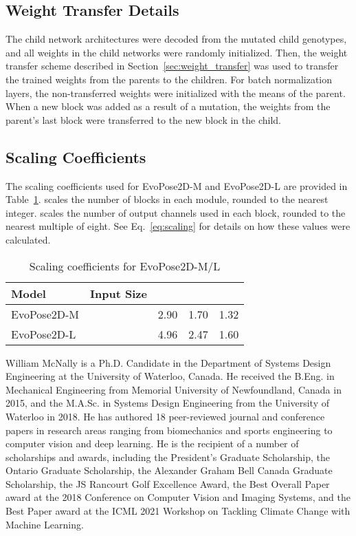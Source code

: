 \documentclass{ieeeaccess}
\begin{document}
\subsection{Weight Transfer Details}
\label{sec:app_wt}
The child network architectures were decoded from the mutated child genotypes, and all weights in the child networks were randomly initialized. Then, the weight transfer scheme described in Section~\ref{sec:weight_transfer} was used to transfer the trained weights from the parents to the children. For batch normalization layers, the non-transferred weights were initialized with the means of the parent. When a new block was added as a result of a mutation, the weights from the parent's last block were transferred to the new block in the child.

\subsection{Scaling Coefficients}
\label{sec:app_scaling}
The scaling coefficients used for EvoPose2D-M and EvoPose2D-L are provided in Table~\ref{tab:scaling_coefficients}.  scales the number of blocks in each module, rounded to the nearest integer.  scales the number of output channels used in each block, rounded to the nearest multiple of eight. See Eq.\ \ref{eq:scaling} for details on how these values were calculated. 

\begin{table}[h]
\footnotesize
\centering
\renewcommand\arraystretch{1.3}
\begin{tabular}{l|c|c|c|c}
	\hline
	Model & Input Size &  &  & \\
	\hline
	EvoPose2D-M &  & 2.90 & 1.70 & 1.32\\
	EvoPose2D-L &  & 4.96 & 2.47 & 1.60\\
	\hline
\end{tabular}
\caption{Scaling coefficients for EvoPose2D-M/L}
\label{tab:scaling_coefficients}
\end{table}





\begin{IEEEbiography}{William McNally} is a Ph.D. Candidate in the Department of Systems Design Engineering at the University of Waterloo, Canada. He received the B.Eng. in Mechanical Engineering from Memorial University of Newfoundland, Canada in 2015, and the M.A.Sc. in Systems Design Engineering from the University of Waterloo in 2018. He has authored 18 peer-reviewed journal and conference papers in research areas ranging from biomechanics and sports engineering to computer vision and deep learning. He is the recipient of a number of scholarships and awards, including the President's Graduate Scholarship, the Ontario Graduate Scholarship, the Alexander Graham Bell Canada Graduate Scholarship, the JS Rancourt Golf Excellence Award, the Best Overall Paper award at the 2018 Conference on Computer Vision and Imaging Systems, and the Best Paper award at the ICML 2021 Workshop on Tackling Climate Change with Machine Learning. 
\end{IEEEbiography}
\end{document}
